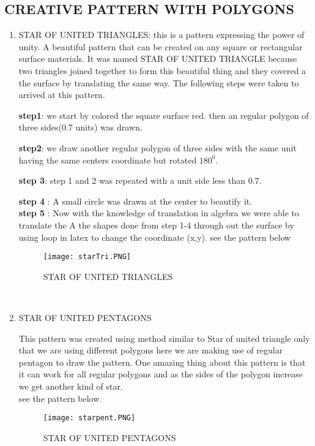 \documentclass{article}
\begin{document}
\subsection{CREATIVE PATTERN WITH POLYGONS}
\begin{enumerate}
    \item STAR OF UNITED TRIANGLES: this is a pattern expressing the power of unity. A beautiful pattern that can be created on any square or rectangular surface materials. It was named STAR OF UNITED TRIANGLE because two triangles joined together to form this beautiful thing and they covered a the surface by translating the same way. The following steps were taken to arrived at this pattern.

 \textbf{step1}: we start by colored the square surface red. then an regular polygon of three sides(0.7 units) was drawn.
 
 \textbf{step2}: we draw another regular polygon of three sides with the same unit having the same centers coordinate but rotated $180^0$.
 
 \textbf{step 3}: step 1 and 2 was repeated with a unit side less than 0.7.
 
 \textbf{step 4} : A small circle was drawn at the center to beautify it.\\
  \textbf{step 5} : Now with the knowledge of translation in algebra we were able to translate the A the shapes  done from step 1-4 through out the surface by using loop in latex to change the coordinate (x,y). see the pattern below
\begin{figure}[htp]
\texttt{[image: starTri.PNG]}
\caption{STAR OF UNITED TRIANGLES}
\end{figure}\\


\item STAR OF UNITED PENTAGONS

This pattern was created using method similar to Star of united triangle only that we are using different polygons here we are making use of regular pentagon to draw the pattern. One amazing thing about this pattern is that it can work for all regular polygons and as the sides of the polygon increase we get another kind of star.\\
see the pattern below.
\begin{figure}[htp]
\texttt{[image: starpent.PNG]}
\caption{STAR OF UNITED PENTAGONS}
\end{figure}
\end{enumerate}
\vspace{4cm}
\end{document}
